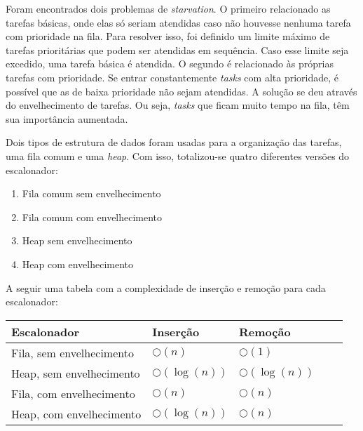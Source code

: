 \documentclass[a4paper,onecolumn, 10pt]{article}
\begin{document}
Foram encontrados dois problemas de \textit{starvation}. O primeiro relacionado as tarefas básicas,
onde elas só seriam atendidas caso não houvesse nenhuma tarefa com prioridade na fila. Para resolver isso, foi definido um
limite máximo de tarefas prioritárias que podem ser atendidas em sequência. Caso esse limite seja excedido, uma tarefa
básica é atendida. O segundo é relacionado às próprias tarefas com prioridade. Se entrar constantemente \textit{tasks} com alta
prioridade, é possível que as de baixa prioridade não sejam atendidas. A solução se deu através do envelhecimento de
tarefas. Ou seja, \textit{tasks} que ficam muito tempo na fila, têm sua importância aumentada.

Dois tipos de estrutura de dados foram usadas para a organização das tarefas, uma fila comum e uma \textit{heap}. Com
isso, totalizou-se quatro diferentes versões do escalonador:
\begin{enumerate}
    \item Fila comum sem envelhecimento
    \item Fila comum com envelhecimento
    \item Heap sem envelhecimento
    \item Heap com envelhecimento
\end{enumerate}
A seguir uma tabela com a complexidade de inserção e remoção para cada escalonador:
\begin{center}
    \begin{tabular}{ | l | l | l | l | p{5cm} |}
    \hline
    Escalonador & Inserção & Remoção \\ \hline
    Fila, sem envelhecimento & $\bigcirc(n)$ & $\bigcirc(1)$ \\ \hline 
    Heap, sem envelhecimento & $\bigcirc(\log(n))$ & $\bigcirc(\log(n))$ \\ \hline
    Fila, com envelhecimento & $\bigcirc(n)$ & $\bigcirc(n)$ \\ \hline
    Heap, com envelhecimento & $\bigcirc(\log(n))$ & $\bigcirc(n)$ \\ \hline
    \end{tabular}
\end{center}
\end{document}
